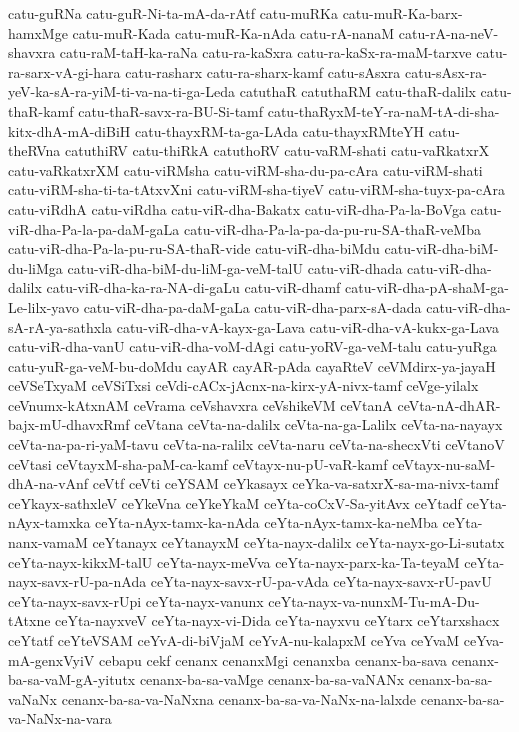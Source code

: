{catu-guRNa
catu-guR-Ni-ta-mA-da-rAtf
catu-muRKa
catu-muR-Ka-barx-hamxMge
catu-muR-Kada
catu-muR-Ka-nAda
catu-rA-nanaM
catu-rA-na-neV-shavxra
catu-raM-taH-ka-raNa
catu-ra-kaSxra
catu-ra-kaSx-ra-maM-tarxve
catu-ra-sarx-vA-gi-hara
catu-rasharx
catu-ra-sharx-kamf
catu-sAsxra
catu-sAsx-ra-yeV-ka-sA-ra-yiM-ti-va-na-ti-ga-Leda
catuthaR
catuthaRM
catu-thaR-dalilx
catu-thaR-kamf
catu-thaR-savx-ra-BU-Si-tamf
catu-thaRyxM-teY-ra-naM-tA-di-sha-kitx-dhA-mA-diBiH
catu-thayxRM-ta-ga-LAda
catu-thayxRMteYH
catu-theRVna
catuthiRV
catu-thiRkA
catuthoRV
catu-vaRM-shati
catu-vaRkatxrX
catu-vaRkatxrXM
catu-viRMsha
catu-viRM-sha-du-pa-cAra
catu-viRM-shati
catu-viRM-sha-ti-ta-tAtxvXni
catu-viRM-sha-tiyeV
catu-viRM-sha-tuyx-pa-cAra
catu-viRdhA
catu-viRdha
catu-viR-dha-Bakatx
catu-viR-dha-Pa-la-BoVga
catu-viR-dha-Pa-la-pa-daM-gaLa
catu-viR-dha-Pa-la-pa-da-pu-ru-SA-thaR-veMba
catu-viR-dha-Pa-la-pu-ru-SA-thaR-vide
catu-viR-dha-biMdu
catu-viR-dha-biM-du-liMga
catu-viR-dha-biM-du-liM-ga-veM-talU
catu-viR-dhada
catu-viR-dha-dalilx
catu-viR-dha-ka-ra-NA-di-gaLu
catu-viR-dhamf
catu-viR-dha-pA-shaM-ga-Le-lilx-yavo
catu-viR-dha-pa-daM-gaLa
catu-viR-dha-parx-sA-dada
catu-viR-dha-sA-rA-ya-sathxla
catu-viR-dha-vA-kayx-ga-Lava
catu-viR-dha-vA-kukx-ga-Lava
catu-viR-dha-vanU
catu-viR-dha-voM-dAgi
catu-yoRV-ga-veM-talu
catu-yuRga
catu-yuR-ga-veM-bu-doMdu
cayAR
cayAR-pAda
cayaRteV
ceVMdirx-ya-jayaH
ceVSeTxyaM
ceVSiTxsi
ceVdi-cACx-jAcnx-na-kirx-yA-nivx-tamf
ceVge-yilalx
ceVnumx-kAtxnAM
ceVrama
ceVshavxra
ceVshikeVM
ceVtanA
ceVta-nA-dhAR-bajx-mU-dhavxRmf
ceVtana
ceVta-na-dalilx
ceVta-na-ga-Lalilx
ceVta-na-nayayx
ceVta-na-pa-ri-yaM-tavu
ceVta-na-ralilx
ceVta-naru
ceVta-na-shecxVti
ceVtanoV
ceVtasi
ceVtayxM-sha-paM-ca-kamf
ceVtayx-nu-pU-vaR-kamf
ceVtayx-nu-saM-dhA-na-vAnf
ceVtf
ceVti
ceYSAM
ceYkasayx
ceYka-va-satxrX-sa-ma-nivx-tamf
ceYkayx-sathxleV
ceYkeVna
ceYkeYkaM
ceYta-coCxV-Sa-yitAvx
ceYtadf
ceYta-nAyx-tamxka
ceYta-nAyx-tamx-ka-nAda
ceYta-nAyx-tamx-ka-neMba
ceYta-nanx-vamaM
ceYtanayx
ceYtanayxM
ceYta-nayx-dalilx
ceYta-nayx-go-Li-sutatx
ceYta-nayx-kikxM-talU
ceYta-nayx-meVva
ceYta-nayx-parx-ka-Ta-teyaM
ceYta-nayx-savx-rU-pa-nAda
ceYta-nayx-savx-rU-pa-vAda
ceYta-nayx-savx-rU-pavU
ceYta-nayx-savx-rUpi
ceYta-nayx-vanunx
ceYta-nayx-va-nunxM-Tu-mA-Du-tAtxne
ceYta-nayxveV
ceYta-nayx-vi-Dida
ceYta-nayxvu
ceYtarx
ceYtarxshacx
ceYtatf
ceYteVSAM
ceYvA-di-biVjaM
ceYvA-nu-kalapxM
ceYva
ceYvaM
ceYva-mA-genxVyiV
cebapu
cekf
cenanx
cenanxMgi
cenanxba
cenanx-ba-sava
cenanx-ba-sa-vaM-gA-yitutx
cenanx-ba-sa-vaMge
cenanx-ba-sa-vaNANx
cenanx-ba-sa-vaNaNx
cenanx-ba-sa-va-NaNxna
cenanx-ba-sa-va-NaNx-na-lalxde
cenanx-ba-sa-va-NaNx-na-vara
}
